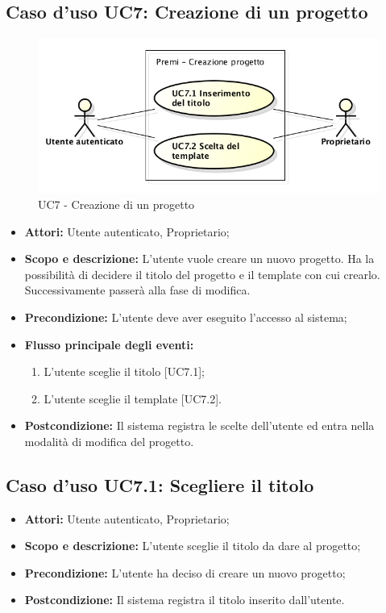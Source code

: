\subsection{Caso d'uso UC7: Creazione di un progetto}
\begin{figure}[h] 
	\centering 
	\includegraphics[scale=0.45] {img/UC7.png}
	\caption{UC7 - Creazione di un progetto} 
\end{figure}

\begin{itemize}
	\item \textbf{Attori:} Utente autenticato, Proprietario;
	\item \textbf{Scopo e descrizione:} L'utente vuole creare un nuovo progetto. Ha la possibilità di decidere il titolo del progetto e il \gls{template} con cui crearlo. Successivamente passerà alla fase di modifica.
	\item \textbf{Precondizione:} L'utente deve aver eseguito l'accesso al sistema;
	\item \textbf{Flusso principale degli eventi:}
	\begin{enumerate}
		\item L'utente sceglie il titolo [UC7.1];
		\item L'utente sceglie il \gls{template} [UC7.2].
	\end{enumerate}
	\item \textbf{Postcondizione:} Il sistema registra le scelte dell'utente ed entra nella modalità di modifica del progetto.
\end{itemize}


\subsection{Caso d'uso UC7.1: Scegliere il titolo}
\begin{itemize}
	\item \textbf{Attori:} Utente autenticato, Proprietario;
	\item \textbf{Scopo e descrizione:} L'utente sceglie il titolo da dare al progetto;
	\item \textbf{Precondizione:} L'utente ha deciso di creare un nuovo progetto;
	\item \textbf{Postcondizione:} Il sistema registra il titolo inserito dall'utente.
\end{itemize}


